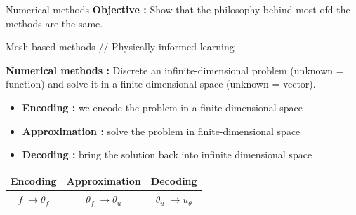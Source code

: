 \begin{frame}{Numerical methods}
	\textbf{Objective :} Show that the philosophy behind most ofd the methods are the same.
	\begin{center}
		Mesh-based methods \hspace{5pt} // \hspace{5pt} Physically informed learning
	\end{center}
	
	\textbf{Numerical methods :} Discrete an infinite-dimensional problem (unknown = function) and solve it in a finite-dimensional space (unknown = vector).
	\begin{itemize}[\textbullet]
		\item \textbf{Encoding :} we encode the problem in a finite-dimensional space
		\item \textbf{Approximation :} solve the problem in finite-dimensional space
		\item \textbf{Decoding :} bring the solution back into infinite dimensional space
	\end{itemize}
	
	\begin{center}
		\begin{tabular}{|c|c|c|}
			\hline
			\textbf{Encoding} & \textbf{Approximation} & \textbf{Decoding} \\
			\hline
			$f \; \rightarrow \theta_f$ & $\theta_f \; \rightarrow \theta_u$ & $\theta_u \; \rightarrow u_\theta$ \\
			\hline
		\end{tabular}
	\end{center}
\end{frame}
